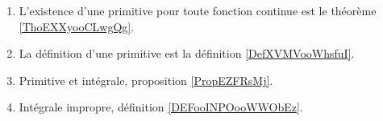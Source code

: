 
\begin{enumerate}
    \item
        L'existence d'une primitive pour toute fonction continue est le théorème \ref{ThoEXXyooCLwgQg}.
    \item
        La définition d'une primitive est la définition \ref{DefXVMVooWhsfuI}.
    \item
        Primitive et intégrale, proposition \ref{PropEZFRsMj}.
    \item
        Intégrale impropre, définition \ref{DEFooINPOooWWObEz}.
\end{enumerate}

